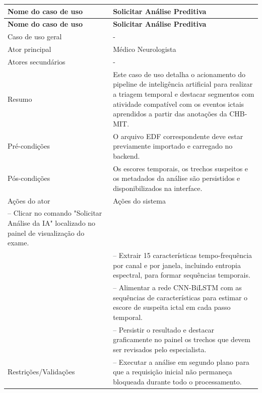 \FloatBarrier{}
\nopagebreak[4]
\begingroup
\fontsize{10}{12}\selectfont
\setlength{\tabcolsep}{3pt}
\renewcommand{\arraystretch}{1.15}
\addtocounter{table}{-1}
\begin{longtable}{|>{\raggedright\arraybackslash}p{}|>{\raggedright\arraybackslash}p{}|}
\hline
\textbf{Nome do caso de uso} & \textbf{Solicitar Análise Preditiva} \\ \hline
\endfirsthead
\hline
\textbf{Nome do caso de uso} & \textbf{Solicitar Análise Preditiva} \\ \hline
\endhead
Caso de uso geral & - \\ \hline
Ator principal & Médico Neurologista \\ \hline
Atores secundários & - \\ \hline
Resumo & Este caso de uso detalha o acionamento do pipeline de inteligência artificial para realizar a triagem temporal e destacar segmentos com atividade compatível com os eventos ictais aprendidos a partir das anotações da CHB-MIT. \\ \hline
Pré-condições & O arquivo EDF correspondente deve estar previamente importado e carregado no backend. \\ \hline
Pós-condições & Os escores temporais, os trechos suspeitos e os metadados da análise são persistidos e disponibilizados na interface. \\ \hline
Ações do ator & Ações do sistema \\ \hline
1 – Clicar no comando "Solicitar Análise da IA" localizado no painel de visualização do exame. &  \\ \hline
 & 2 – Extrair 15 características tempo-frequência por canal e por janela, incluindo entropia espectral, para formar sequências temporais. \\ \hline
 & 3 – Alimentar a rede CNN-BiLSTM com as sequências de características para estimar o escore de suspeita ictal em cada passo temporal. \\ \hline
 & 4 – Persistir o resultado e destacar graficamente no painel os trechos que devem ser revisados pelo especialista. \\ \hline
Restrições/Validações & 1 – Executar a análise em segundo plano para que a requisição inicial não permaneça bloqueada durante todo o processamento. \\ \hline
\end{longtable}
\endgroup
{}
